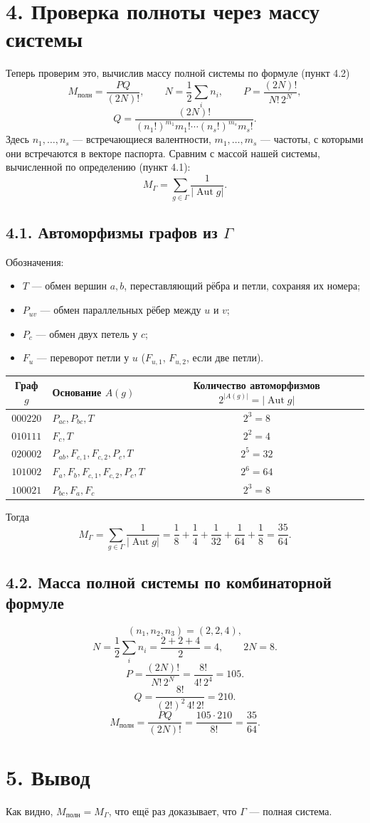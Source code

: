 \documentclass[12pt,a4paper]{article}
\newcommand{\Aut}{\operatorname{Aut}}
\begin{document}
\newpage
\section*{4. Проверка полноты через массу системы}
Теперь проверим это, вычислив массу полной системы по формуле (пункт 4.2)
\[
M_{\text{полн}}=\frac{PQ}{(2N)!},\qquad
N=\frac12\sum_i n_i,\qquad
P=\frac{(2N)!}{N!\,2^N},
\]
\[
Q=\frac{(2N)!}{(n_1!)^{m_1}m_1!\cdots(n_s!)^{m_s}m_s!}.
\]
Здесь $n_1,\ldots,n_s$ --- встречающиеся валентности,
$m_1,\ldots,m_s$ --- частоты, с которыми они встречаются в векторе паспорта.
Сравним с массой нашей системы, вычисленной по определению (пункт 4.1):
\[
M_{\Gamma}=\sum_{g\in\Gamma}\frac{1}{|\Aut g|}.
\]

\subsection*{4.1. Автоморфизмы графов из $\Gamma$}
Обозначения:
\begin{itemize}
\item $T$ --- обмен вершин $a,b$, переставляющий рёбра и петли,
сохраняя их номера;
\item $P_{uv}$ --- обмен параллельных рёбер между $u$ и $v$;
\item $P_c$ --- обмен двух петель у $c$;
\item $F_u$ --- переворот петли у $u$ ($F_{u,1}$, $F_{u,2}$, если две петли).
\end{itemize}

\begin{center}
\renewcommand{\arraystretch}{1.4}
\begin{tabular}{clc}
\toprule
Граф $g$ & Основание $A(g)$ & Количество автоморфизмов $2^{|A(g)|}=|\Aut g|$\\
\midrule
$000220$ & $P_{ac},P_{bc},T$ & $2^3=8$\\
$010111$ & $F_c,T$ & $2^2=4$\\
$020002$ & $P_{ab},F_{c,1},F_{c,2},P_c,T$ & $2^5=32$\\
$101002$ & $F_a,F_b,F_{c,1},F_{c,2},P_c,T$ & $2^6=64$\\
$100021$ & $P_{bc},F_a,F_c$ & $2^3=8$\\
\bottomrule
\end{tabular}
\end{center}
Тогда
\[
M_{\Gamma}=\sum_{g\in\Gamma}\frac{1}{|\Aut g|}
=\frac18+\frac14+\frac1{32}+\frac1{64}+\frac18
=\boxed{\frac{35}{64}}.
\]

\newpage
\subsection*{4.2. Масса полной системы по комбинаторной формуле}
\[
(n_1,n_2,n_3)=(2,2,4),
\]
\[
N=\frac12\sum_i n_i=\frac{2+2+4}{2}=4,
\qquad 2N=8.
\]
\[
P=\frac{(2N)!}{N!\,2^N}
=\frac{8!}{4!\,2^4}=105.
\]
\[
Q=\frac{8!}{(2!)^2\,4!\,2!}=210.
\]
\[
M_{\text{полн}}=\frac{PQ}{(2N)!}
=\frac{105\cdot210}{8!}
=\boxed{\frac{35}{64}}.
\]

\section*{5. Вывод}
Как видно, $M_{\text{полн}}=M_{\Gamma}$, что ещё раз доказывает,
что $\Gamma$ --- полная система.
\end{document}
